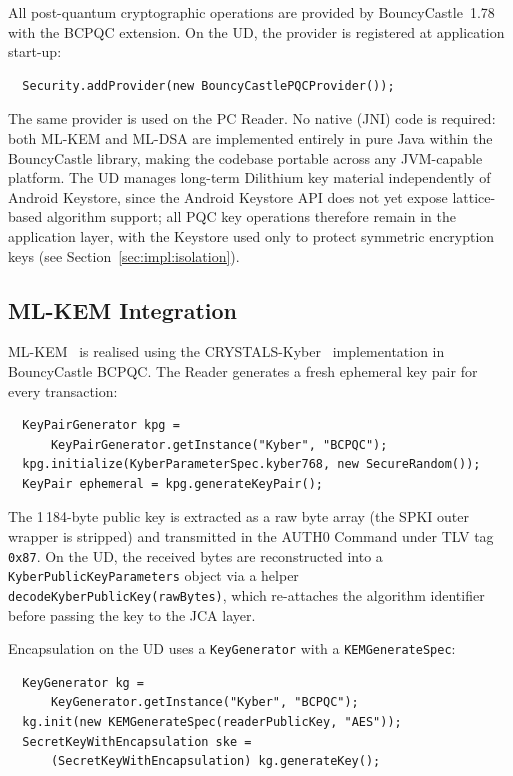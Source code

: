 \documentclass[runningheads]{llncs}
\begin{document}
All post-quantum cryptographic operations are provided by BouncyCastle~1.78
with the BCPQC extension.
On the UD, the provider is registered at application start-up:
\begin{verbatim}
  Security.addProvider(new BouncyCastlePQCProvider());
\end{verbatim}
The same provider is used on the PC Reader.
No native (JNI) code is required: both ML-KEM and ML-DSA are implemented
entirely in pure Java within the BouncyCastle library, making the codebase
portable across any JVM-capable platform.
The UD manages long-term Dilithium key material independently of Android
Keystore, since the Android Keystore API does not yet expose lattice-based
algorithm support; all PQC key operations therefore remain in the application
layer, with the Keystore used only to protect symmetric encryption keys (see
Section~\ref{sec:impl:isolation}).

\subsection{ML-KEM Integration}
\label{sec:impl:mlkem}

ML-KEM~\cite{NIST:FIPS203} is realised using the
CRYSTALS-Kyber~\cite{EuroSP:BDKLLSSSS18} implementation in BouncyCastle BCPQC.
The Reader generates a fresh ephemeral key pair for every transaction:

\begin{verbatim}
  KeyPairGenerator kpg =
      KeyPairGenerator.getInstance("Kyber", "BCPQC");
  kpg.initialize(KyberParameterSpec.kyber768, new SecureRandom());
  KeyPair ephemeral = kpg.generateKeyPair();
\end{verbatim}

\noindent
The 1\,184-byte public key is extracted as a raw byte array (the SPKI
outer wrapper is stripped) and transmitted in the AUTH0 Command under TLV
tag \texttt{0x87}.
On the UD, the received bytes are reconstructed into a
\texttt{Kyber\allowbreak Public\allowbreak Key\allowbreak Parameters} object via a helper
\texttt{decode\allowbreak Kyber\allowbreak Public\allowbreak Key(rawBytes)}, which re-attaches the algorithm
identifier before passing the key to the JCA layer.

Encapsulation on the UD uses a \texttt{KeyGenerator} with a
\texttt{KEMGenerateSpec}:
\begin{verbatim}
  KeyGenerator kg =
      KeyGenerator.getInstance("Kyber", "BCPQC");
  kg.init(new KEMGenerateSpec(readerPublicKey, "AES"));
  SecretKeyWithEncapsulation ske =
      (SecretKeyWithEncapsulation) kg.generateKey();
\end{verbatim}
\end{document}
